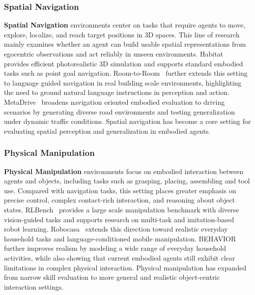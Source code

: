\documentclass{llmxive}
\begin{document}
\subsubsection{Spatial Navigation}
\label{Spatial Navigation}
\textbf{Spatial Navigation} environments center on tasks that require agents to move, explore, localize, and reach target positions in 3D spaces. This line of research mainly examines whether an agent can build usable spatial representations from egocentric observations and act reliably in unseen environments. 
Habitat~\cite{Habitat} provides efficient photorealistic 3D simulation and supports standard embodied tasks such as point goal navigation. Room-to-Room~\cite{Room-to-Room} further extends this setting to language guided navigation in real building scale environments, highlighting the need to ground natural language instructions in perception and action. MetaDrive~\cite{MetaDrive} broadens navigation oriented embodied evaluation to driving scenarios by generating diverse road environments and testing generalization under dynamic traffic conditions. Spatial navigation has become a core setting for evaluating spatial perception and generalization in embodied agents.

\subsubsection{Physical Manipulation}
\label{Physical Manipulation}
\textbf{Physical Manipulation} environments focus on embodied interaction between agents and objects, including tasks such as grasping, placing, assembling and tool use. Compared with navigation tasks, this setting places greater emphasis on precise control, complex contact-rich interaction, and reasoning about object states. RLBench~\cite{RLBench} provides a large scale manipulation benchmark with diverse vision-guided tasks and supports research on multi-task and imitation-based robot learning. Robocasa~\cite{Robocasa} extends this direction toward realistic everyday household tasks and language-conditioned mobile manipulation. BEHAVIOR~\cite{BEHAVIOR} further improves realism by modeling a wide range of everyday household activities, while also showing that current embodied agents still exhibit clear limitations in complex physical interaction. Physical manipulation has expanded from narrow skill evaluation to more general and realistic object-centric interaction settings.
\end{document}
